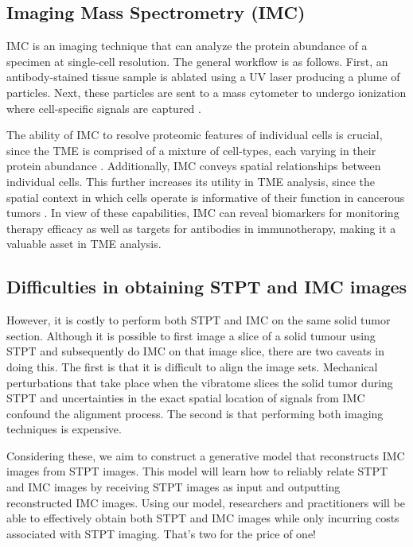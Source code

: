 \documentclass[10pt,twocolumn,letterpaper]{article}
\begin{document}
\subsection{Imaging Mass Spectrometry (IMC)}

IMC is an imaging technique that can analyze the protein abundance of a specimen at single-cell resolution. The general workflow is as follows. First, an antibody-stained tissue sample is ablated using a UV laser producing a plume of particles. Next, these particles are sent to a mass cytometer to undergo ionization where cell-specific signals are captured \cite{devine_2021_mass}.

The ability of IMC to resolve proteomic features of individual cells is crucial, since the TME is comprised of a mixture of cell-types, each varying in their protein abundance \cite{spitzer_2016_mass}. Additionally, IMC conveys spatial relationships between individual cells. This further increases its utility in TME analysis, since the spatial context in which cells operate is informative of their function in cancerous tumors \cite{baharlou_2019_mass}. In view of these capabilities, IMC can reveal biomarkers for monitoring therapy efficacy as well as  targets for antibodies in immunotherapy, making it a valuable asset in TME analysis. 

\subsection{Difficulties in obtaining STPT and IMC images}
However, it is costly to perform both STPT and IMC on the same solid tumor section. Although it is possible to first image a slice of a solid tumour using STPT and subsequently do IMC on that image slice, there are two caveats in doing this. The first is that it is difficult to align the image sets. Mechanical perturbations that take place when the vibratome slices the solid tumor during STPT and uncertainties in the exact spatial location of signals from IMC confound the alignment process. The second is that performing both imaging techniques is expensive.

Considering these, we aim to construct a generative model that reconstructs IMC images from STPT images. This model will learn how to reliably relate STPT and IMC images by receiving STPT images as input and outputting reconstructed IMC images. Using our model, researchers and practitioners will be able to effectively obtain both STPT and IMC images while only incurring costs associated with STPT imaging. That’s two for the price of one!
\end{document}
